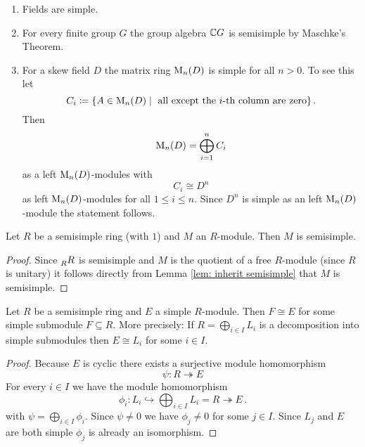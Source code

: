 \begin{expls}
  \begin{enumerate}[label=\emph{\alph*)},leftmargin=*]
    \item
      Fields are simple.
    \item
      For every finite group $G$ the group algebra $\mathbb{C} G$ is semisimple by Maschke’s Theorem.
    \item
      For a skew field $D$ the matrix ring $\operatorname{M}_n(D)$ is simple for all $n > 0$.
      To see this let
      \[
        C_i
        \coloneqq \{
                    A \in \operatorname{M}_n(D)
                  \mid
                    \text{ all except the $i$-th column are zero}
                  \} \,.
      \]
      Then
      \[
          \operatorname{M}_n(D)
        = \bigoplus_{i=1}^n C_i
      \]
      as a left $\operatorname{M}_n(D)$-modules with
      \[
        C_i \cong D^n
      \]
      as left $\operatorname{M}_n(D)$-modules for all $1 \leq i \leq n$.
      Since $D^n$ is simple as an left $\operatorname{M}_n(D)$-module the statement follows.
  \end{enumerate}
\end{expls}


\begin{prop}
  Let $R$ be a semisimple ring (with $1$) and $M$ an $R$-module.
  Then $M$ is semisimple.
\end{prop}
\begin{proof}
  Since $\prescript{}{R}{R}$ is semisimple and $M$ is the quotient of a free $R$-module (since $R$ is unitary) it follows directly from Lemma \ref{lem: inherit semisimple} that $M$ is semisimple.
\end{proof}


\begin{lem}\label{lem: simple module of semisimple ring is direct summand}
  Let $R$ be a semisimple ring and $E$ a simple $R$-module.
  Then $F \cong E$ for some simple submodule $F \subseteq R$.
  More precisely:
  If $R = \bigoplus_{i \in I} L_i$ is a decomposition into simple submodules then $E \cong L_i$ for some $i \in I$.
\end{lem}
\begin{proof}
  Because $E$ is cyclic there exists a surjective module homomorphism
  \[
                        \psi
    \colon              R
    \twoheadrightarrow  E
  \]
  For every $i \in I$ we have the module homomorphism
  \[
                        \phi_i
    \colon              L_i
    \hookrightarrow     \bigoplus_{i \in I} L_i
    =                   R
    \twoheadrightarrow  E \,.
  \]
  with $\psi = \bigoplus_{i \in I} \phi_i$.
  Since $\psi \neq 0$ we have $\phi_j \neq 0$ for some $j \in I$.
  Since $L_j$ and $E$ are both simple $\phi_j$ is already an isomorphism.
\end{proof}


